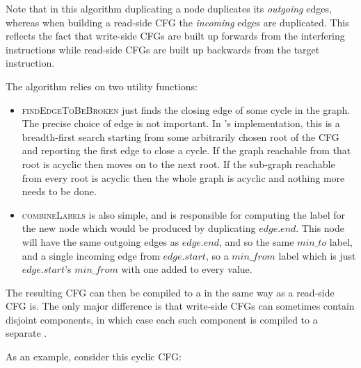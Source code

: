 Note that in this algorithm duplicating a node duplicates its
\emph{outgoing} edges, whereas when building a read-side CFG the
\emph{incoming} edges are duplicated.  This reflects the fact that
write-side CFGs are built up forwards from the interfering
instructions while read-side CFGs are built up backwards from the
target instruction.  

The algorithm relies on two utility functions:

\begin{itemize}
\item \textsc{findEdgeToBeBroken} just finds the closing edge of some
  cycle in the graph.  The precise choice of edge is not
  important.  In {\implementation}'s implementation, this is a
  breadth-first search starting from some arbitrarily chosen root of
  the CFG and reporting the first edge to close a cycle.  If the graph
  reachable from that root is acyclic then {\implementation} moves on
  to the next root.  If the sub-graph reachable from every root is
  acyclic then the whole graph is acyclic and nothing more needs to be
  done.
\item \textsc{combineLabels} is also simple, and is responsible for
  computing the label for the new node which would be produced by
  duplicating $edge.end$.  This node will have the same outgoing edges
  as $edge.end$, and so the same $min\_to$ label, and a single
  incoming edge from $edge.start$, so a $min\_from$ label which is
  just $edge.start$'s $min\_from$ with one added to every value.
\end{itemize}

The resulting CFG can then be compiled to a {\StateMachine} in the
same way as a read-side CFG is.  The only major difference is that
write-side CFGs can sometimes contain disjoint components, in which
case each such component is compiled to a separate {\StateMachine}.

As an example, consider this cyclic CFG:

